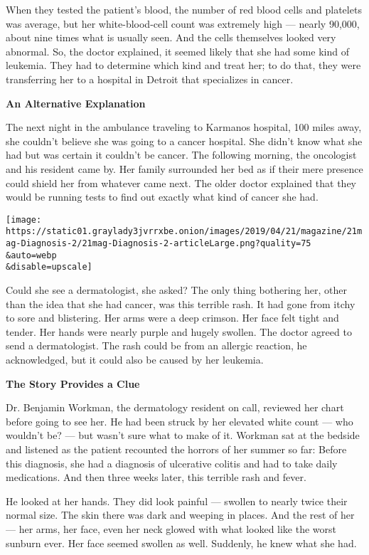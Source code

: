 When they tested the patient's blood, the number of red blood cells and
platelets was average, but her white-blood-cell count was extremely high
--- nearly 90,000, about nine times what is usually seen. And the cells
themselves looked very abnormal. So, the doctor explained, it seemed
likely that she had some kind of leukemia. They had to determine which
kind and treat her; to do that, they were transferring her to a hospital
in Detroit that specializes in cancer.

\textbf{An Alternative Explanation}

The next night in the ambulance traveling to Karmanos hospital, 100
miles away, she couldn't believe she was going to a cancer hospital. She
didn't know what she had but was certain it couldn't be cancer. The
following morning, the oncologist and his resident came by. Her family
surrounded her bed as if their mere presence could shield her from
whatever came next. The older doctor explained that they would be
running tests to find out exactly what kind of cancer she had.

\texttt{[image: https://static01.graylady3jvrrxbe.onion/images/2019/04/21/magazine/21mag-Diagnosis-2/21mag-Diagnosis-2-articleLarge.png?quality=75\\\&auto=webp\\\&disable=upscale]}

Could she see a dermatologist, she asked? The only thing bothering her,
other than the idea that she had cancer, was this terrible rash. It had
gone from itchy to sore and blistering. Her arms were a deep crimson.
Her face felt tight and tender. Her hands were nearly purple and hugely
swollen. The doctor agreed to send a dermatologist. The rash could be
from an allergic reaction, he acknowledged, but it could also be caused
by her leukemia.

\textbf{The Story Provides a Clue}

Dr. Benjamin Workman, the dermatology resident on call, reviewed her
chart before going to see her. He had been struck by her elevated white
count --- who wouldn't be? --- but wasn't sure what to make of it.
Workman sat at the bedside and listened as the patient recounted the
horrors of her summer so far: Before this diagnosis, she had a diagnosis
of ulcerative colitis and had to take daily medications. And then three
weeks later, this terrible rash and fever.

He looked at her hands. They did look painful --- swollen to nearly
twice their normal size. The skin there was dark and weeping in places.
And the rest of her --- her arms, her face, even her neck glowed with
what looked like the worst sunburn ever. Her face seemed swollen as
well. Suddenly, he knew what she had.

